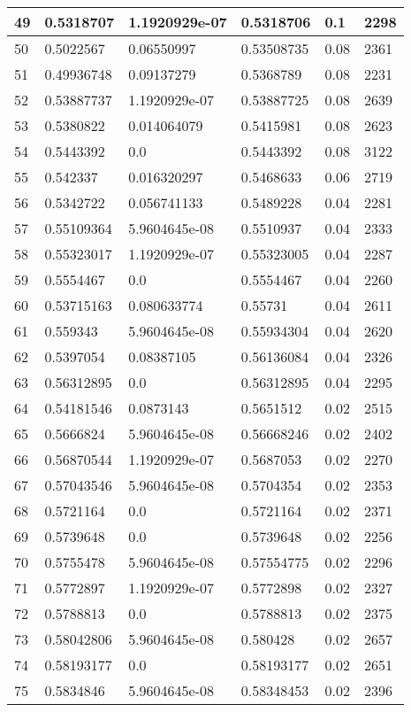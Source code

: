\begin{longtable}{|l|l|l|l|l|l|}
49 & 0.5318707 & 1.1920929e-07 & 0.5318706 & 0.1 & 2298 \\ \hline 
50 & 0.5022567 & 0.06550997 & 0.53508735 & 0.08 & 2361 \\ \hline 
51 & 0.49936748 & 0.09137279 & 0.5368789 & 0.08 & 2231 \\ \hline 
52 & 0.53887737 & 1.1920929e-07 & 0.53887725 & 0.08 & 2639 \\ \hline 
53 & 0.5380822 & 0.014064079 & 0.5415981 & 0.08 & 2623 \\ \hline 
54 & 0.5443392 & 0.0 & 0.5443392 & 0.08 & 3122 \\ \hline 
55 & 0.542337 & 0.016320297 & 0.5468633 & 0.06 & 2719 \\ \hline 
56 & 0.5342722 & 0.056741133 & 0.5489228 & 0.04 & 2281 \\ \hline 
57 & 0.55109364 & 5.9604645e-08 & 0.5510937 & 0.04 & 2333 \\ \hline 
58 & 0.55323017 & 1.1920929e-07 & 0.55323005 & 0.04 & 2287 \\ \hline 
59 & 0.5554467 & 0.0 & 0.5554467 & 0.04 & 2260 \\ \hline 
60 & 0.53715163 & 0.080633774 & 0.55731 & 0.04 & 2611 \\ \hline 
61 & 0.559343 & 5.9604645e-08 & 0.55934304 & 0.04 & 2620 \\ \hline 
62 & 0.5397054 & 0.08387105 & 0.56136084 & 0.04 & 2326 \\ \hline 
63 & 0.56312895 & 0.0 & 0.56312895 & 0.04 & 2295 \\ \hline 
64 & 0.54181546 & 0.0873143 & 0.5651512 & 0.02 & 2515 \\ \hline 
65 & 0.5666824 & 5.9604645e-08 & 0.56668246 & 0.02 & 2402 \\ \hline 
66 & 0.56870544 & 1.1920929e-07 & 0.5687053 & 0.02 & 2270 \\ \hline 
67 & 0.57043546 & 5.9604645e-08 & 0.5704354 & 0.02 & 2353 \\ \hline 
68 & 0.5721164 & 0.0 & 0.5721164 & 0.02 & 2371 \\ \hline 
69 & 0.5739648 & 0.0 & 0.5739648 & 0.02 & 2256 \\ \hline 
70 & 0.5755478 & 5.9604645e-08 & 0.57554775 & 0.02 & 2296 \\ \hline 
71 & 0.5772897 & 1.1920929e-07 & 0.5772898 & 0.02 & 2327 \\ \hline 
72 & 0.5788813 & 0.0 & 0.5788813 & 0.02 & 2375 \\ \hline 
73 & 0.58042806 & 5.9604645e-08 & 0.580428 & 0.02 & 2657 \\ \hline 
74 & 0.58193177 & 0.0 & 0.58193177 & 0.02 & 2651 \\ \hline 
75 & 0.5834846 & 5.9604645e-08 & 0.58348453 & 0.02 & 2396 \\ \hline 
\end{longtable}
